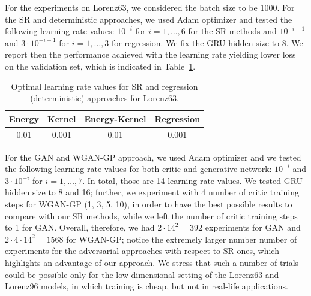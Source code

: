 \documentclass[twoside,11pt]{article}
\begin{document}
	For the experiments on Lorenz63, we considered the batch size to be 1000. For the SR and deterministic approaches, we used Adam optimizer and tested the following learning rate values: $ 10^{-i} $ for $ i=1,\ldots, 6 $ for the SR methods and $ 10^{-i-1} $ and $ 3\cdot 10^{-i - 1} $ for $ i=1,\ldots, 3 $ for regression.
	We fix the GRU hidden size to 8. 
	We report then the performance achieved with the learning rate yielding lower loss on the validation set, which is indicated in Table~\ref{tab:lr_lorenz63_SR}.
	\begin{table}
		\begin{center}
			\begin{tabular}{cccc}
				\toprule
				Energy & Kernel & Energy-Kernel & Regression \\
				\midrule
				0.01  & 0.001 & 0.01 & 0.001 \\
				\bottomrule
			\end{tabular}
		\end{center}
		\caption{Optimal learning rate values for SR and regression (deterministic) approaches for Lorenz63.}
		\label{tab:lr_lorenz63_SR}
	\end{table}
	
	
	
	
	
	For the GAN and WGAN-GP approach, we used Adam optimizer and we tested the following learning rate values for both critic and generative network: $ 10^{-i} $ and $ 3\cdot 10^{-i} $ for $ i=1,\ldots, 7$. In total, those are 14 learning rate values. 
	We tested GRU hidden size to 8 and 16; further, we experiment with 4 number of critic training steps for WGAN-GP (1, 3, 5, 10), in order to have the best possible results to compare with our SR methods, while we left the number of critic training steps to 1 for GAN. Overall, therefore, we had $ 2\cdot 14^2  = 392$ experiments for GAN and  $ 2\cdot 4 \cdot 14^2  = 1568$ for WGAN-GP; notice the extremely larger number number of experiments for the adversarial approaches with respect to SR ones, which highlights an advantage of our approach. We stress that such a number of trials could be possible only for the low-dimensional setting of the Lorenz63 and Lorenz96 models, in which training is cheap, but not in real-life applications.
	
\end{document}
